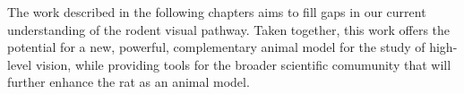 The work described in the following chapters aims to fill gaps in our current understanding of the rodent visual pathway. Taken together, this work offers the potential for a new, powerful, complementary animal model for the study of high-level vision, while providing tools for the broader scientific comumunity that will further enhance the rat as an animal model.






